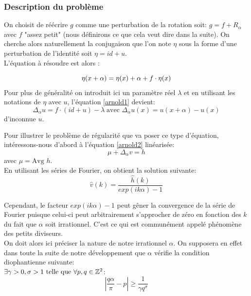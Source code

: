 \documentclass[11pt,a4paper]{article}
\begin{document}
\subsubsection{Description du problème}
On choisit de réécrire $g$ comme une perturbation de la rotation soit: $g= f + R_\alpha$ avec $f$ "assez petit" (nous définirons ce que cela veut dire dans la suite). On cherche alors naturellement la conjugaison que l'on note $\eta$ sous la forme d'une perturbation de l'identité soit $\eta=id+u$. \\
L'équation à résoudre est alors :

\begin{equation}\label{arnold1}
\eta(x + \alpha)= \eta(x) + \alpha + f \cdot \eta(x) \\
\end{equation}
Pour plus de généralité on introduit ici un paramètre réel $\lambda$ et en utilisant les notations de $\eta$ avec $u$, l'équation \eqref{arnold1} devient:
\begin{equation}\label{arnold2}
\Delta_\alpha u= f \cdot (id +u) - \lambda \; \text{avec  } \Delta_\alpha u(x)= u(x+\alpha) - u(x)
\end{equation}
d'inconnue $u$.
\par Pour illustrer le problème de régularité que va poser ce type d'équation, intéressons-nous d'abord à l'équation \eqref{arnold2} linéarisée:
\begin{equation}\label{arnold3}
\mu + \Delta_\alpha v = h 
\end{equation}
avec $\mu= \text{Avg } h$. \\
En utilisant les séries de Fourier, on obtient la solution suivante:
\begin{equation*}
\hat{v}(k)=\frac{\hat{h}(k)}{exp(ik \alpha) - 1}
\end{equation*}

Cependant, le facteur $exp(ik \alpha) - 1$ peut gêner la convergence de la série de Fourier puisque celui-ci peut arbitrairement s'approcher de zéro en fonction des $k$ du fait que $\alpha$ soit irrationnel. C'est ce qui est communément appelé phénomène des petits diviseurs. \\
On doit alors ici préciser la nature de notre irrationnel $\alpha$. On supposera en effet dans toute la suite de notre développement que $\alpha$ vérifie la condition diophantienne suivante: \\
 $ \exists \gamma>0,\sigma>1 \ \text{telle que} \ \forall p,q \in \mathbb Z^2 $:
\begin{equation}
|\frac{q \alpha}{\pi}-p|\geq \frac{1}{\gamma q^\sigma}
\end{equation} 
\end{document}
